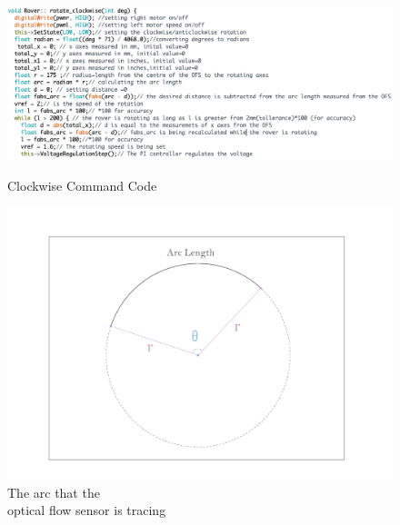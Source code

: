 \documentclass[a4paper]{article}
\begin{document}
\begin{figure}[H]
    \centering
    \begin{minipage}{.7\textwidth}
      \centering
      \includegraphics[scale=0.3]{./media/clockwise.png}
      \caption{Clockwise Command Code}
      \label{fig: Clockwise Command Code}
    \end{minipage}%
    \begin{minipage}{.3\textwidth}
      \centering
      \includegraphics[scale = 0.2]{./media/image3.pdf}
      \caption{The arc that the \\ optical flow sensor is tracing}
      \label{fig: Optical Flow Sensor Arc}
    \end{minipage}
\end{figure}

   
\end{document}
